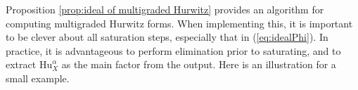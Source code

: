 \documentclass[12pt]{article}
\theoremstyle{definition}
\newcommand{\bP}{\mathbb P}
\begin{document}

 Proposition \ref{prop:ideal of multigraded Hurwitz}
provides an algorithm for computing multigraded Hurwitz forms.
When implementing this, it is important to be
clever about all saturation steps, especially that
in (\ref{eq:idealPhi}). In practice, it is advantageous to
perform elimination prior to saturating, and to 
extract $\mathrm{Hu}^\alpha_X$ as the main factor from the output.
Here is an illustration for a small example.
 
\end{document}

